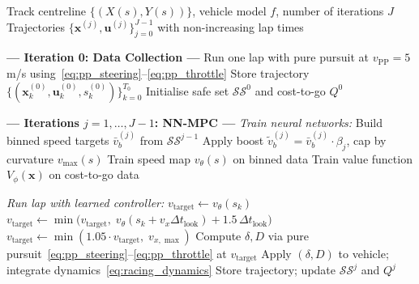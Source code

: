\begin{algorithm}[ht]
\caption{NN-MPC Iterative Learning for Autonomous Racing}
\label{alg:nnmpc}
\begin{algorithmic}[1]
\Require Track centreline $\{(X(s), Y(s))\}$, vehicle model $f$, number of iterations $J$
\Ensure Trajectories $\{\mathbf{x}^{(j)}, \mathbf{u}^{(j)}\}_{j=0}^{J-1}$ with non-increasing lap times

\Statex \textbf{--- Iteration 0: Data Collection ---}
\State Run one lap with pure pursuit at $v_{\mathrm{PP}} = 5$\,m/s using~\eqref{eq:pp_steering}--\eqref{eq:pp_throttle}
\State Store trajectory $\{(\mathbf{x}_k^{(0)}, \mathbf{u}_k^{(0)}, s_k^{(0)})\}_{k=0}^{T_0}$
\State Initialise safe set $\mathcal{SS}^0$ and cost-to-go $Q^0$

\Statex \textbf{--- Iterations $j = 1, \ldots, J-1$: NN-MPC ---}
    \Statex \quad \textit{Train neural networks:}
    \State Build binned speed targets $\bar{v}_b^{(j)}$ from $\mathcal{SS}^{j-1}$  \hfill {}
    \State Apply boost $\tilde{v}_b^{(j)} = \bar{v}_b^{(j)} \cdot \beta_j$, cap by curvature $v_{\max}(s)$ \hfill {}
    \State Train speed map $v_\theta(s)$ on binned data \hfill {}
    \State Train value function $V_\phi(\mathbf{x})$ on cost-to-go data \hfill {}

    \Statex \quad \textit{Run lap with learned controller:}
        \State $v_{\mathrm{target}} \gets v_\theta(s_k)$ \hfill {}
        \State $v_{\mathrm{target}} \gets \min\!\bigl(v_{\mathrm{target}},\; v_\theta(s_k + v_x \Delta t_{\mathrm{look}}) + 1.5\,\Delta t_{\mathrm{look}}\bigr)$ \hfill {}
         \hfill {}
            \State $v_{\mathrm{target}} \gets \min(1.05 \cdot v_{\mathrm{target}},\; v_{x,\max})$
        \EndIf
        \State Compute $\delta, D$ via pure pursuit~\eqref{eq:pp_steering}--\eqref{eq:pp_throttle} at $v_{\mathrm{target}}$ \hfill {}
        \State Apply $(\delta, D)$ to vehicle; integrate dynamics~\eqref{eq:racing_dynamics}
    \EndFor
    \State Store trajectory; update $\mathcal{SS}^j$ and $Q^j$
\EndFor
\end{algorithmic}
\end{algorithm}


